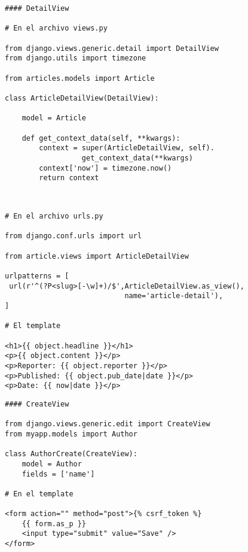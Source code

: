 \documentclass[xcolor=dvipsnames]{beamer}
\begin{document}
\begin{frame}[fragile]
\begin{verbatim}
#### DetailView

# En el archivo views.py

from django.views.generic.detail import DetailView
from django.utils import timezone

from articles.models import Article

class ArticleDetailView(DetailView):

    model = Article

    def get_context_data(self, **kwargs):
        context = super(ArticleDetailView, self).
                  get_context_data(**kwargs)
        context['now'] = timezone.now()
        return context
        
\end{verbatim}
\end{frame}

\begin{frame}[fragile]
\begin{verbatim}

# En el archivo urls.py

from django.conf.urls import url

from article.views import ArticleDetailView

urlpatterns = [
 url(r'^(?P<slug>[-\w]+)/$',ArticleDetailView.as_view(),
                            name='article-detail'),
]

# El template

<h1>{{ object.headline }}</h1>
<p>{{ object.content }}</p>
<p>Reporter: {{ object.reporter }}</p>
<p>Published: {{ object.pub_date|date }}</p>
<p>Date: {{ now|date }}</p>
\end{verbatim}
\end{frame}

\begin{frame}[fragile]
\begin{verbatim}
#### CreateView

from django.views.generic.edit import CreateView
from myapp.models import Author

class AuthorCreate(CreateView):
    model = Author
    fields = ['name']

# En el template

<form action="" method="post">{% csrf_token %}
    {{ form.as_p }}
    <input type="submit" value="Save" />
</form>

\end{verbatim}
\end{frame}
\end{document}
